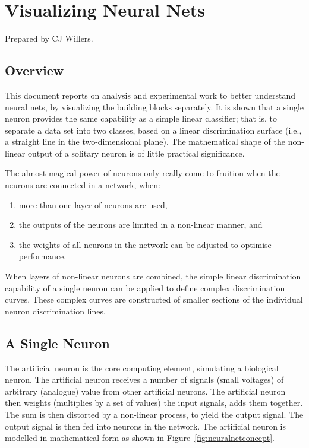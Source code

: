 
\chapter{Visualizing Neural Nets}
\label{sec:VisualizingNeuralNets}

Prepared by CJ Willers.


\section{Overview}
\label{sec:OverviewAppc}

This document reports on analysis and experimental work to better understand neural nets, by visualizing the building blocks separately.  It is shown that a single neuron provides the same capability as a simple linear classifier; that is, to separate a data set into two classes, based on a linear discrimination surface (i.e., a straight line in the two-dimensional plane).  The mathematical shape of  the non-linear output of a solitary neuron is of little practical significance.

The almost magical power of neurons only really come to fruition when the neurons are connected in a network, when: 
\begin{enumerate}
\item more than one layer of neurons are used, 
\item the outputs of the neurons are limited in a non-linear manner, and 
\item the weights of all neurons in the network can be adjusted to optimise performance.
\end{enumerate}

When layers of non-linear neurons are combined, the simple linear discrimination capability of a single neuron can be applied to define complex discrimination curves.  These complex curves are constructed of smaller sections of the individual neuron discrimination lines.

\section{A Single Neuron}

The artificial neuron is the core computing element, simulating a biological neuron.  The artificial neuron receives a number of signals (small voltages) of arbitrary (analogue) value from other artificial neurons.  The artificial neuron then weights (multiplies by a set of values) the input signals, adds them together.  The sum is then distorted by a non-linear process, to yield the output signal. The output signal is then fed into neurons in the network.   The artificial neuron is modelled in mathematical form as shown in Figure~\ref{fig:neuralnetconcept}.

